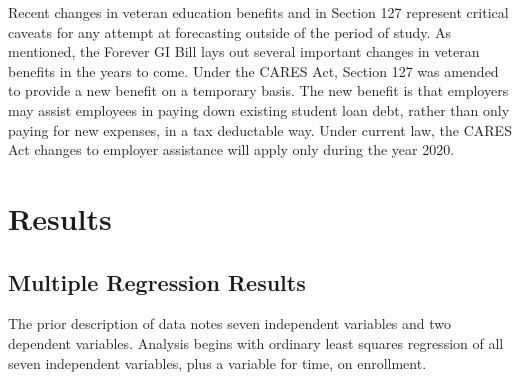 \documentclass[review]{elsarticle}
\begin{document}
Recent changes in veteran education benefits and in Section 127
represent critical caveats for any attempt at forecasting outside of the period of study.
As mentioned, the Forever GI Bill lays out several important changes in veteran benefits in the years to come.
Under the CARES Act, Section 127 was amended to provide a new benefit on a temporary basis\cite{schiavo_2020}.
The new benefit is that employers may assist employees in paying down existing student loan debt,
rather than only paying for new expenses, in a tax deductable way.
Under current law, the CARES Act changes to employer assistance will apply only during the year 2020.


\section{Results}


\subsection{Multiple Regression Results}
The prior description of data notes seven independent variables and two dependent variables.
Analysis begins with ordinary least squares regression of all seven independent variables,
plus a variable for time, on enrollment.
\end{document}

